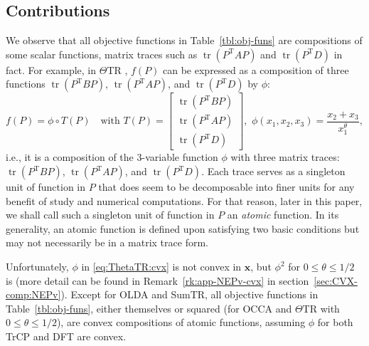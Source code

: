 \documentclass[11pt]{article}
\def\bx{\pmb{x}}
\def\bbR{\mathbb{R}}
\DeclareMathOperator{\tr}{tr}
\DeclareMathOperator{\T}{T}
\theoremstyle{definition}
\numberwithin{equation}{section}
\begin{document}
\subsection{Contributions}\label{ssec:contribute}
We observe that all objective functions in Table~\ref{tbl:obj-funs} are compositions of some scalar functions,
matrix traces such as $\tr(P^{\T}AP)$ and $\tr(P^{\T}D)$ in fact.
For example,
in $\Theta$TR \cite{wazl:2023},
$f(P)$ can be expressed as a composition of three functions $\tr(P^{\T}BP)$, $\tr(P^{\T}AP)$, and $\tr(P^{\T}D)$  by $\phi$:
\begin{equation}\label{eq:ThetaTR:cvx}
f(P)=\phi\circ T(P)
\quad\mbox{with}\,\, T(P)=\begin{bmatrix}
                             \tr(P^{\T}BP) \\
                             \tr(P^{\T}AP) \\
                             \tr(P^{\T}D)
                           \end{bmatrix}, \,\,
\phi(x_1,x_2,x_3)
    =\frac {x_2+x_3}{x_1^{\theta}},
\end{equation}
i.e., it is a composition of the 3-variable function $\phi$ with three matrix traces: $\tr(P^{\T}BP)$, $\tr(P^{\T}AP)$,
and $\tr(P^{\T}D)$. Each trace serves as a singleton unit of function in $P$ that does seem to be decomposable into finer units
for any benefit of study and numerical computations. For that reason, later in this paper, we shall call
such a  singleton unit of function in $P$ an {\em atomic\/} function. In its generality, an atomic function
is defined upon satisfying two basic conditions but may not necessarily be in a matrix trace form.

Unfortunately, $\phi$ in \eqref{eq:ThetaTR:cvx} is not convex in $\bx$, but $\phi^2$ for $0\le\theta\le 1/2$ is (more detail can be found in Remark~\ref{rk:app-NEPv-cvx} in section~\ref{sec:CVX-comp:NEPv}).
Except  for OLDA and SumTR,
all objective functions in Table~\ref{tbl:obj-funs}, either themselves or squared (for OCCA and $\Theta$TR with $0\le\theta\le 1/2$), are
convex compositions of atomic functions, assuming  $\phi$ for both TrCP and DFT are convex.
\end{document}
